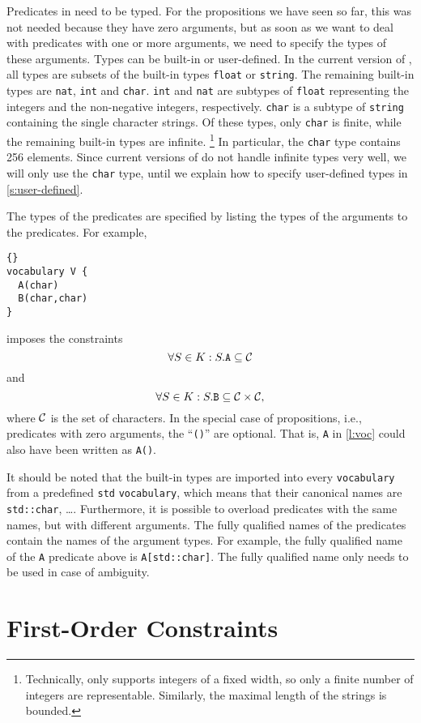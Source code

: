 \documentclass{article}
\begin{document}
Predicates in \idp need to be typed.  For the propositions we have
seen so far, this was not needed because they have zero arguments,
but as soon as we want to deal with predicates with one or more arguments,
we need to specify the types of these arguments.
Types can be built-in or user-defined.
In the current version of \idp, all types are subsets of
the built-in types \texttt{float} or \texttt{string}.
The remaining built-in types are \texttt{nat}, \texttt{int} and
\texttt{char}.  \texttt{int} and \texttt{nat} are subtypes of
\texttt{float} representing the integers and the non-negative
integers, respectively.  \texttt{char} is a subtype of \texttt{string}
containing the single character strings.
Of these types, only \texttt{char} is finite, while the remaining
built-in types are infinite.%
\footnote{Technically, \idp only supports integers of a fixed width,
so only a finite number of integers are representable.  Similarly,
the maximal length of the strings is bounded.}
In particular, the \texttt{char} type contains 256 elements.
Since current versions of \idp do not handle infinite types very well,
we will only use the \texttt{char} type, until we explain how
to specify user-defined types in \autoref{s:user-defined}.

The types of the predicates are specified by listing the types
of the arguments to the predicates.  For example,
\begin{lstlisting}{}
vocabulary V {
  A(char)
  B(char,char)
}
\end{lstlisting}
imposes the constraints
$$
\forall S \in K : S.\mathtt{A} \subseteq {\cal C}
$$
and
$$
\forall S \in K : S.\mathtt{B} \subseteq {\cal C} \times {\cal C}
,
$$
where $\cal C$ is the set of characters.
In the special case of propositions, i.e., predicates with zero arguments,
the ``\texttt{()}'' are optional.  That is, \texttt{A} in \autoref{l:voc}
could also have been written as \texttt{A()}.

It should be noted that the built-in types are imported into
every \texttt{vocabulary} from a predefined \texttt{std} \texttt{vocabulary},
which means that their canonical names are \texttt{std::char}, \ldots.
Furthermore, it is possible to overload predicates with the same names,
but with different arguments.  The fully qualified names of the predicates
contain the names of the argument types.  For example, the
fully qualified name of the \texttt{A} predicate above is
\texttt{A[std::char]}.
The fully qualified name only needs to be used in case of ambiguity.

\section{First-Order Constraints}
\label{s:first-order}
\end{document}
